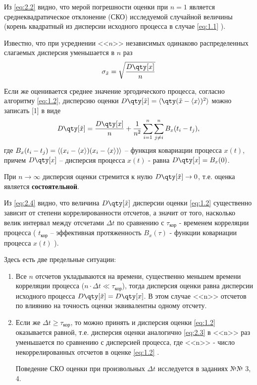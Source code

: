 Из \eqref{eq:2.2} видно, что мерой погрешности оценки при $n=1$ является 
среднеквадратическое отклонение (СКО) исследуемой случайной величины (корень квадратный из дисперсии
исходного процесса в случае \eqref{eq:1.1} ).

Известно, что при усреднении <<$n$>> независимых одинаково распределенных
слагаемых дисперсия уменьшается в $n$ раз
\begin{equation}
    \label{eq:2.3}
    \sigma_{\tilde x} = \sqrt{ \frac{D\qty[x] }{n}}
\end{equation}

Если же оценивается среднее значение эргодического процесса, согласно алгоритму
\eqref{eq:1.2}, дисперсию оценки $D\qty[\tilde x] = \mean{ \qty( \tilde x - \mean{x} )^2 }$
можно записать [1] в виде
\begin{equation}
    \label{eq:2.4}
    D\qty[\tilde x] = \frac{\D{x}}{n} + \frac{1}{n^2} \sum\limits_{i=1}^{n} \sum\limits_{j\neq i}^{n} B_x(t_i - t_j),
\end{equation}
где $B_x(t_i - t_j) = \langle (x_i - \langle x\rangle) (x_i - \langle x\rangle)  \rangle$ -- функция
ковариации процесса  $x(t)$, причем $\D{x}$ -- дисперсия процесса $x(t)$ -
равна $\D{x}=B_x(0)$.

При $n \to \infty$ дисперсия оценки стремится к нулю $\D{\tilde x} \to 0$, т.е.
оценка является \textbf{состоятельной}.

Из \eqref{eq:2.4} видно, что величина $\D{\tilde x}$ дисперсии оценки \eqref{eq:1.2} 
существенно зависит от степени коррелированности отсчетов, а значит от того, насколько
велик интервал между отсчетами $\Delta t$ по сравнению с $\tau_{\text{кор}}$ - временем
корреляции процесса ( $t_{\text{кор}}$ -- эффективная протяженность $B_x(\tau)$ - 
функции ковариации процесса $x(t)$ ).


Здесь есть две предельные ситуации:
\begin{enumerate}
    \item Все $n$ отсчетов укладываются на времени, существенно меньшем времени корреляции
        процесса ($n\cdot \Delta t \ll \tau_{\text{кор}}$), тогда дисперсия оценки равна
        дисперсии исходного процесса $\D{\tilde x}= \D{x}$. В этом случае <<n>> отсчетов
        по влиянию на точность оценки эквивалентны одному отсчету.
    \item  Если же $\Delta t \geq \tau_{\text{кор}}$, то можно принять  и дисперсия оценки \eqref{eq:1.2} 
        оказывается равной, т.е. дисперсия оценки аналогично \eqref{eq:2.3}  в <<n>> раз уменьшается по сравнению с дисперсией процесса, где <<n>> ‑ число некоррелированных отсчетов в оценке \eqref{eq:1.2} .

Поведение СКО оценки при произвольных $\Delta t$ исследуется в заданиях №№ 3, 4.
\end{enumerate}



